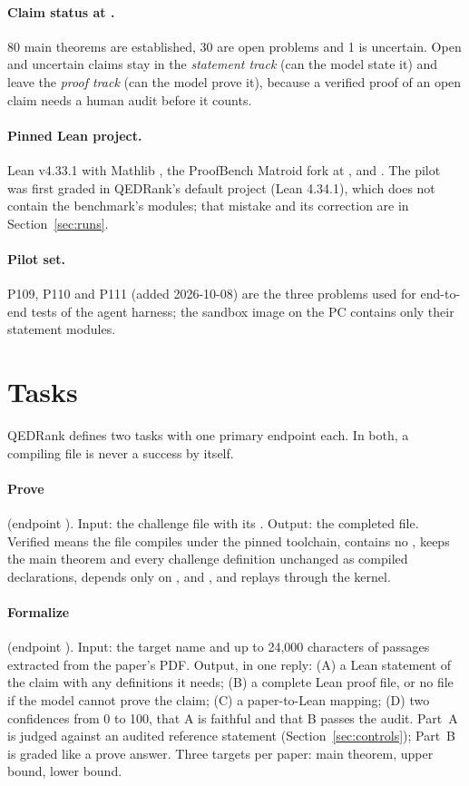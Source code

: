 \documentclass[11pt,a4paper]{article}
\begin{document}
\paragraph{Claim status at .} 80 main theorems are established, 30 are open problems and 1 is uncertain. Open and uncertain claims stay in the \emph{statement track} (can the model state it) and leave the \emph{proof track} (can the model prove it), because a verified proof of an open claim needs a human audit before it counts.

\paragraph{Pinned Lean project.} Lean v4.33.1 with Mathlib , the ProofBench Matroid fork at , and . The pilot was first graded in QEDRank's default project (Lean 4.34.1), which does not contain the benchmark's modules; that mistake and its correction are in Section~\ref{sec:runs}.

\paragraph{Pilot set.} P109, P110 and P111 (added 2026-10-08) are the three problems used for end-to-end tests of the agent harness; the sandbox image on the PC contains only their statement modules.

\section{Tasks}

QEDRank defines two tasks with one primary endpoint each. In both, a compiling file is never a success by itself.

\paragraph{Prove} (endpoint ). Input: the challenge file with its . Output: the completed file. Verified means the file compiles under the pinned toolchain, contains no , keeps the main theorem and every challenge definition unchanged as compiled declarations, depends only on ,  and , and replays through the kernel.

\paragraph{Formalize} (endpoint ). Input: the target name and up to 24,000 characters of passages extracted from the paper's PDF. Output, in one reply: (A) a Lean statement of the claim with any definitions it needs; (B) a complete Lean proof file, or no file if the model cannot prove the claim; (C) a paper-to-Lean mapping; (D) two confidences from 0 to 100, that A is faithful and that B passes the audit. Part~A is judged against an audited reference statement (Section~\ref{sec:controls}); Part~B is graded like a prove answer. Three targets per paper: main theorem, upper bound, lower bound.
\end{document}
